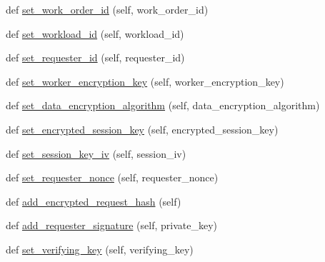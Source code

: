 \begin{DoxyCompactItemize}
\item 
def \hyperlink{classavalon__sdk_1_1work__order_1_1work__order__params_1_1WorkOrderParams_af604f05cf7acdeac68e28a798c259a2a}{set\+\_\+work\+\_\+order\+\_\+id} (self, work\+\_\+order\+\_\+id)
\item 
def \hyperlink{classavalon__sdk_1_1work__order_1_1work__order__params_1_1WorkOrderParams_af5e85da9f19d4810d89ee896f454ea76}{set\+\_\+workload\+\_\+id} (self, workload\+\_\+id)
\item 
def \hyperlink{classavalon__sdk_1_1work__order_1_1work__order__params_1_1WorkOrderParams_ab4812b2c4475be8c88d04f8a2c622846}{set\+\_\+requester\+\_\+id} (self, requester\+\_\+id)
\item 
def \hyperlink{classavalon__sdk_1_1work__order_1_1work__order__params_1_1WorkOrderParams_aec25e26e161d21b49a18254df58f3c98}{set\+\_\+worker\+\_\+encryption\+\_\+key} (self, worker\+\_\+encryption\+\_\+key)
\item 
def \hyperlink{classavalon__sdk_1_1work__order_1_1work__order__params_1_1WorkOrderParams_ad82332c49c4b0680ac50d084457f4d61}{set\+\_\+data\+\_\+encryption\+\_\+algorithm} (self, data\+\_\+encryption\+\_\+algorithm)
\item 
def \hyperlink{classavalon__sdk_1_1work__order_1_1work__order__params_1_1WorkOrderParams_a2ee1bd3c94c523b3fcf3d6200e8e989d}{set\+\_\+encrypted\+\_\+session\+\_\+key} (self, encrypted\+\_\+session\+\_\+key)
\item 
def \hyperlink{classavalon__sdk_1_1work__order_1_1work__order__params_1_1WorkOrderParams_a532d859be1c1ad9c7c3d47634dfc4e8e}{set\+\_\+session\+\_\+key\+\_\+iv} (self, session\+\_\+iv)
\item 
def \hyperlink{classavalon__sdk_1_1work__order_1_1work__order__params_1_1WorkOrderParams_a809aa1ef28a3b100a268629b4a293bb2}{set\+\_\+requester\+\_\+nonce} (self, requester\+\_\+nonce)
\item 
def \hyperlink{classavalon__sdk_1_1work__order_1_1work__order__params_1_1WorkOrderParams_a3d663e55cfc7a0521248cc970ae21941}{add\+\_\+encrypted\+\_\+request\+\_\+hash} (self)
\item 
def \hyperlink{classavalon__sdk_1_1work__order_1_1work__order__params_1_1WorkOrderParams_ac62ccd0857e6a75850e63c584d2d6a46}{add\+\_\+requester\+\_\+signature} (self, private\+\_\+key)
\item 
def \hyperlink{classavalon__sdk_1_1work__order_1_1work__order__params_1_1WorkOrderParams_a2f17ce36503160b5fc4fc0e2de5b1c56}{set\+\_\+verifying\+\_\+key} (self, verifying\+\_\+key)
\item 

\end{DoxyCompactItemize}
